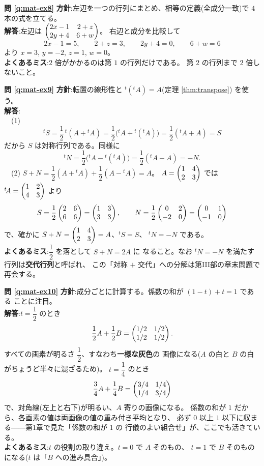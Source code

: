 \bigskip
\noindent\textbf{問 \ref{q:mat-ex8}}\quad
\textbf{方針}:左辺を一つの行列にまとめ、相等の定義(全成分一致)で
$4$ 本の式を立てる。\\
\textbf{解答}:左辺は $\begin{pmatrix}2x - 1 & 2 + z \\ 2y + 4 & 6 + w\end{pmatrix}$。
右辺と成分を比較して
\[
2x - 1 = 5, \qquad 2 + z = 3, \qquad 2y + 4 = 0, \qquad 6 + w = 6
\]
より $x = 3$, $y = -2$, $z = 1$, $w = 0$。\\
\textbf{よくあるミス}:$2$ 倍がかかるのは第 $1$ の行列だけである。
第 $2$ の行列まで $2$ 倍しないこと。

\bigskip
\noindent\textbf{問 \ref{q:mat-ex9}}\quad
\textbf{方針}:転置の線形性と ${}^t({}^t\!A) = A$(定理 \ref{thm:transpose})
を使う。\\
\textbf{解答}:\\
　(1)
\[
{}^t S = \frac{1}{2}\,{}^t(A + {}^t\!A)
= \frac{1}{2}\bigl({}^t\!A + {}^t({}^t\!A)\bigr)
= \frac{1}{2}({}^t\!A + A) = S
\]
だから $S$ は対称行列である。同様に
\[
{}^t N = \frac{1}{2}\bigl({}^t\!A - {}^t({}^t\!A)\bigr)
= \frac{1}{2}({}^t\!A - A) = -N.
\]
　(2) $S + N = \dfrac{1}{2}(A + {}^t\!A) + \dfrac{1}{2}(A - {}^t\!A) = A$。
$A = \begin{pmatrix}1 & 4 \\ 2 & 3\end{pmatrix}$ では ${}^t\!A = \begin{pmatrix}1 & 2 \\ 4 & 3\end{pmatrix}$ より
\[
S = \frac{1}{2}\begin{pmatrix}2 & 6 \\ 6 & 6\end{pmatrix} = \begin{pmatrix}1 & 3 \\ 3 & 3\end{pmatrix}, \qquad
N = \frac{1}{2}\begin{pmatrix}0 & 2 \\ -2 & 0\end{pmatrix} = \begin{pmatrix}0 & 1 \\ -1 & 0\end{pmatrix}
\]
で、確かに $S + N = \begin{pmatrix}1 & 4 \\ 2 & 3\end{pmatrix} = A$、${}^t S = S$、
${}^t N = -N$ である。\\
\textbf{よくあるミス}:$\dfrac{1}{2}$ を落として $S + N = 2A$ に
なること。なお ${}^t\!N = -N$ を満たす行列は\textbf{交代行列}と呼ばれ、
この「対称 $+$ 交代」への分解は第III部の章末問題で再会する。

\bigskip
\noindent\textbf{問 \ref{q:mat-ex10}}\quad
\textbf{方針}:成分ごとに計算する。係数の和が $(1 - t) + t = 1$ である
ことに注目。\\
\textbf{解答}:$t = \dfrac{1}{2}$ のとき
\[
\frac{1}{2}A + \frac{1}{2}B = \begin{pmatrix}1/2 & 1/2 \\ 1/2 & 1/2\end{pmatrix}.
\]
すべての画素が明るさ $\dfrac{1}{2}$、すなわち\textbf{一様な灰色}の
画像になる($A$ の白と $B$ の白がちょうど半々に混ざるため)。
$t = \dfrac{1}{4}$ のとき
\[
\frac{3}{4}A + \frac{1}{4}B = \begin{pmatrix}3/4 & 1/4 \\ 1/4 & 3/4\end{pmatrix}
\]
で、対角線(左上と右下)が明るい、$A$ 寄りの画像になる。
係数の和が $1$ だから、各画素の値は両画像の値の重み付き平均となり、
必ず $0$ 以上 $1$ 以下に収まる――第1章で見た「係数の和が $1$ の
行儀のよい組合せ」が、ここでも活きている。\\
\textbf{よくあるミス}:$t$ の役割の取り違え。$t = 0$ で $A$ そのもの、
$t = 1$ で $B$ そのものになる($t$ は「$B$ への進み具合」)。

